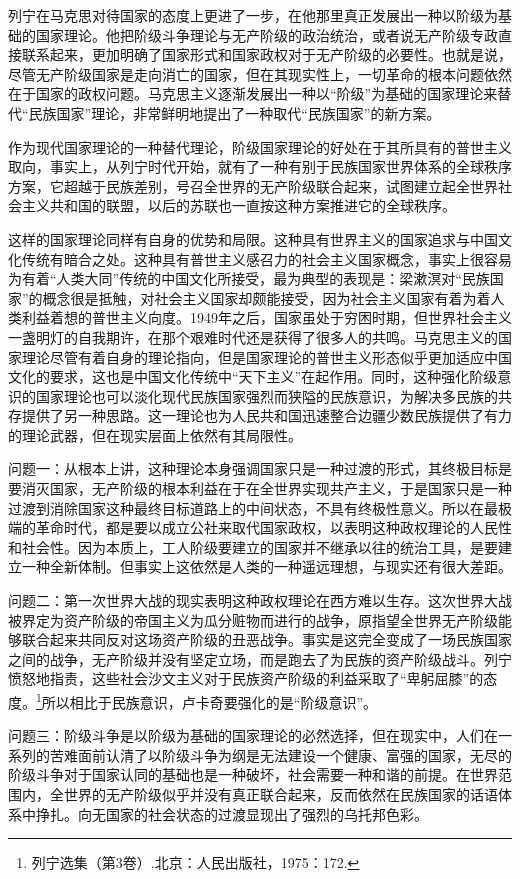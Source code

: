 \documentclass[UTF8, 12pt, a4paper]{ctexrep}
\begin{document}
列宁在马克思对待国家的态度上更进了一步，在他那里真正发展出一种以阶级为基础的国家理论。他把阶级斗争理论与无产阶级的政治统治，或者说无产阶级专政直接联系起来，更加明确了国家形式和国家政权对于无产阶级的必要性。也就是说，尽管无产阶级国家是走向消亡的国家，但在其现实性上，一切革命的根本问题依然在于国家的政权问题。马克思主义逐渐发展出一种以“阶级”为基础的国家理论来替代“民族国家”理论，非常鲜明地提出了一种取代“民族国家”的新方案。

作为现代国家理论的一种替代理论，阶级国家理论的好处在于其所具有的普世主义取向，事实上，从列宁时代开始，就有了一种有别于民族国家世界体系的全球秩序方案，它超越于民族差别，号召全世界的无产阶级联合起来，试图建立起全世界社会主义共和国的联盟，以后的苏联也一直按这种方案推进它的全球秩序。

这样的国家理论同样有自身的优势和局限。这种具有世界主义的国家追求与中国文化传统有暗合之处。这种具有普世主义感召力的社会主义国家概念，事实上很容易为有着“人类大同”传统的中国文化所接受，最为典型的表现是：梁漱溟对“民族国家”的概念很是抵触，对社会主义国家却颇能接受，因为社会主义国家有着为着人类利益着想的普世主义向度。1949年之后，国家虽处于穷困时期，但世界社会主义一盏明灯的自我期许，在那个艰难时代还是获得了很多人的共鸣。马克思主义的国家理论尽管有着自身的理论指向，但是国家理论的普世主义形态似乎更加适应中国文化的要求，这也是中国文化传统中“天下主义”在起作用。同时，这种强化阶级意识的国家理论也可以淡化现代民族国家强烈而狭隘的民族意识，为解决多民族的共存提供了另一种思路。这一理论也为人民共和国迅速整合边疆少数民族提供了有力的理论武器，但在现实层面上依然有其局限性。

问题一：从根本上讲，这种理论本身强调国家只是一种过渡的形式，其终极目标是要消灭国家，无产阶级的根本利益在于在全世界实现共产主义，于是国家只是一种过渡到消除国家这种最终目标道路上的中间状态，不具有终极性意义。所以在最极端的革命时代，都是要以成立公社来取代国家政权，以表明这种政权理论的人民性和社会性。因为本质上，工人阶级要建立的国家并不继承以往的统治工具，是要建立一种全新体制。但事实上这依然是人类的一种遥远理想，与现实还有很大差距。

问题二：第一次世界大战的现实表明这种政权理论在西方难以生存。这次世界大战被界定为资产阶级的帝国主义为瓜分赃物而进行的战争，原指望全世界无产阶级能够联合起来共同反对这场资产阶级的丑恶战争。事实是这完全变成了一场民族国家之间的战争，无产阶级并没有坚定立场，而是跑去了为民族的资产阶级战斗。列宁愤怒地指责，这些社会沙文主义对于民族资产阶级的利益采取了“卑躬屈膝”的态度。\footnote{列宁选集（第3卷）.北京：人民出版社，1975：172.}所以相比于民族意识，卢卡奇要强化的是“阶级意识”。

问题三：阶级斗争是以阶级为基础的国家理论的必然选择，但在现实中，人们在一系列的苦难面前认清了以阶级斗争为纲是无法建设一个健康、富强的国家，无尽的阶级斗争对于国家认同的基础也是一种破坏，社会需要一种和谐的前提。在世界范围内，全世界的无产阶级似乎并没有真正联合起来，反而依然在民族国家的话语体系中挣扎。向无国家的社会状态的过渡显现出了强烈的乌托邦色彩。
\end{document}
